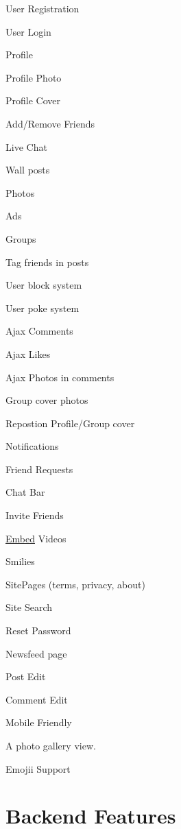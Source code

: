 \begin{DoxyItemize}
\item User Registration
\item User Login
\item Profile
\item Profile Photo
\item Profile Cover
\item Add/\+Remove Friends
\item Live Chat
\item Wall posts
\item Photos
\item Ads
\item Groups
\item Tag friends in posts
\item User block system
\item User poke system
\item Ajax Comments
\item Ajax Likes
\item Ajax Photos in comments
\item Group cover photos
\item Repostion Profile/\+Group cover
\item Notifications
\item Friend Requests
\item Chat Bar
\item Invite Friends
\item \hyperlink{namespace_embed}{Embed} Videos
\item Smilies
\item Site\+Pages (terms, privacy, about)
\item Site Search
\item Reset Password
\item Newsfeed page
\item Post Edit
\item Comment Edit
\item Mobile Friendly
\item A photo gallery view.
\item Emojii Support
\end{DoxyItemize}

\section*{Backend Features }


